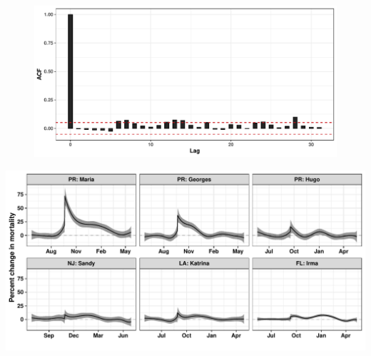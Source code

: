 \documentclass[11pt]{article}
\begin{document}
\begin{suppfigure}[ht]
\begin{subfigure}[t]{0.49\linewidth}
		\caption{} 
		\label{supp-fig:qqplot-correlated}
	\end{subfigure}
	\hfill
	\begin{subfigure}[t]{0.49\linewidth}
		\centering
		\includegraphics[width=1\linewidth]{figs//supp-figure-2d.pdf}
		\caption{} 
		\label{supp-fig:no-correlation}
	\end{subfigure}
	\caption{}
	\label{supp-fig:correlated-errors}
\end{suppfigure}

\begin{suppfigure}[ht]
	\centering
	\includegraphics[width=1\linewidth]{figs/supp-figure-3.pdf} 
	\caption{}
	\label{supp-fig:hurricane-effects}
\end{suppfigure}
\end{document}
